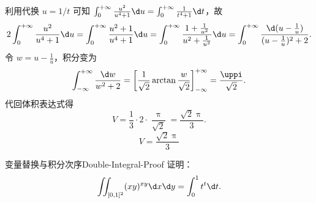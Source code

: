 \begin{solution}
\begin{equation}
    \end{equation}
    利用代换 $u = 1/t$ 可知 $\int_{0}^{+\infty} \frac{u^2}{u^4 + 1} \d u = \int_{0}^{+\infty} \frac{1}{t^4 + 1} \d t$，故
    \begin{equation}
        2 \int_{0}^{+\infty} \frac{u^2}{u^4 + 1} \d u = \int_{0}^{+\infty} \frac{u^2 + 1}{u^4 + 1} \d u = \int_{0}^{+\infty} \frac{1 + \frac{1}{u^2}}{u^2 + \frac{1}{u^2}} \d u = \int_{0}^{+\infty} \frac{\d (u - \frac{1}{u})}{(u - \frac{1}{u})^2 + 2}.
    \end{equation}
    令 $w = u - \frac{1}{u}$，积分变为
    \begin{equation}
        \int_{-\infty}^{+\infty} \frac{\d w}{w^2 + 2} = \left[ \frac{1}{\sqrt{2}} \arctan \frac{w}{\sqrt{2}} \right]_{-\infty}^{+\infty} = \frac{\uppi}{\sqrt{2}}.
    \end{equation}
    代回体积表达式得
    \begin{equation}
        V = \frac{1}{3} \cdot 2 \cdot \frac{\uppi}{\sqrt{2}} = \frac{\sqrt{2}\uppi}{3}.
    \end{equation}
    \begin{equation}
        \boxed{V = \frac{\sqrt{2}\uppi}{3}}
    \end{equation}
\end{solution}

\begin{problem}{变量替换与积分次序}{Double-Integral-Proof}
    证明：
    \begin{equation}
        \iint_{[0,1]^2} (xy)^{xy} \d x \d y = \int_0^1 t^t \d t.
    \end{equation}
\end{problem}

